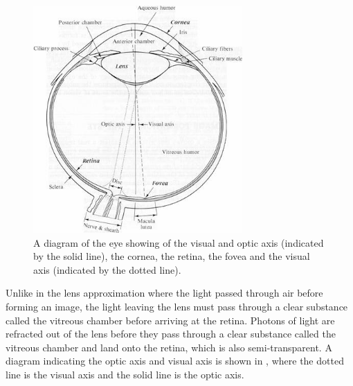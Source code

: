 \begin{figure}[H]
\centering
  \includegraphics[width=8cm]{figures/eye_diagram}
\caption{A diagram of the eye showing of the visual
 	  and optic axis (indicated by the solid line), the cornea, the retina, the fovea
              and the visual axis (indicated by the dotted line).\cite{yannuzzi2011retinal}}
\label{fig:optic_axis}
\end{figure}

Unlike in the lens approximation where the light passed through air before forming an
image, the light leaving the lens must pass through a clear substance called the
vitreous chamber before arriving at the retina. Photons of light are refracted out of the
lens before they pass through a clear substance called the vitreous chamber and land
onto the retina, which is also semi-transparent. A diagram indicating the optic axis and
visual axis is shown in , where the dotted line is the visual axis and
the solid line is the optic axis.

